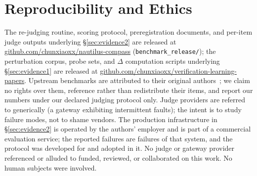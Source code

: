 \documentclass[11pt]{article}
\begin{document}
\section{Reproducibility and Ethics}
\label{sec:repro}

The re-judging routine, scoring protocol, preregistration documents, and
per-item judge outputs underlying \S\ref{sec:evidence2} are released at
\url{github.com/chunxiaoxx/nautilus-compass} (\texttt{benchmark\_release/});
the perturbation corpus, probe sets, and $\Delta$ computation scripts
underlying \S\ref{sec:evidence1} are released at
\url{github.com/chunxiaoxx/verification-learning-papers}. Upstream
benchmarks are attributed to their original authors~\cite{longmemeval,lmev2};
we claim no rights over them, reference rather than redistribute their items,
and report our numbers under our declared judging protocol only. Judge
providers are referred to
generically (a gateway exhibiting intermittent faults); the intent is to
study failure modes, not to shame vendors. The production infrastructure in
\S\ref{sec:evidence2} is operated by the authors' employer and is part of a
commercial evaluation service; the reported failures are failures of that
system, and the protocol was developed for and adopted in it. No judge or
gateway provider referenced or alluded to funded, reviewed, or collaborated
on this work. No human subjects were involved.
\end{document}
